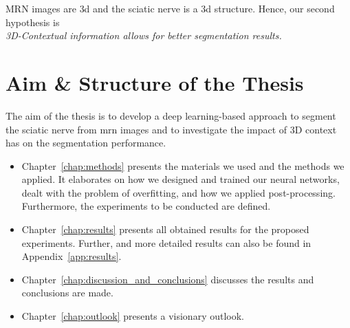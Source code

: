 MRN images are \acrlong{3d} and the sciatic nerve is a \acrlong{3d} structure. Hence, our second hypothesis is\\

\textit{3D-Contextual information allows for better segmentation results.}

\section{Aim \& Structure of the Thesis} %
The aim of the thesis is to develop a deep learning-based approach to segment the sciatic nerve from \gls{mrn} images and to investigate the impact of 3D context has on the segmentation performance.\\
\begin{itemize}
    \item Chapter~\ref{chap:methods} presents the materials we used and the methods we applied. It elaborates on how we designed and trained our neural networks, dealt with the problem of overfitting, and how we applied post-processing. Furthermore, the experiments to be conducted are defined.
    \item Chapter~\ref{chap:results} presents all obtained results for the proposed experiments. Further, and more detailed results can also be found in Appendix~\ref{app:results}.
    \item Chapter~\ref{chap:discussion_and_conclusions} discusses the results and conclusions are made.
    \item Chapter~\ref{chap:outlook} presents a visionary outlook.
\end{itemize}

\endinput